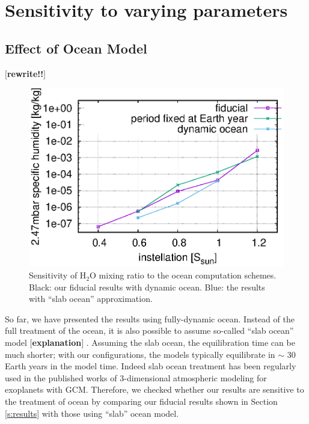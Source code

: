 \documentclass[11pt,numberedappendix,twocolappendix,]{emulateapj}
\def\water{H$_2$O }
\def\memo#1{\color{red}$[${\bf #1}$]$ \color{black}}
\begin{document}
\section{Sensitivity to varying parameters}
\label{s:sensitivity}

\subsection{Effect of Ocean Model}
\label{ss:sensitivity_ocean}

\memo{rewrite!!}

\begin{figure}[!h]
    \begin{center}
    \includegraphics[width=\hsize]{fig/AqOH0TLS_GJ876_q_sensitivity_changeS0X.eps}
    \end{center}
\caption{Sensitivity of \water mixing ratio to the ocean computation schemes. Black: our fiducial results with dynamic ocean. Blue: the results with ``slab ocean'' approximation. }
\label{fig:change_ocean}
\end{figure}

So far, we have presented the results using fully-dynamic ocean. 
Instead of the full treatment of the ocean, it is also possible to assume so-called ``slab ocean'' model \memo{explanation}. 
Assuming the slab ocean, the equilibration time can be much shorter; with our configurations, the models typically equilibrate in $\sim $ 30 Earth years in the model time. 
Indeed slab ocean treatment has been regularly used in the published works of 3-dimensional atmospheric modeling for exoplanets with GCM. 
Therefore, we checked whether our results are sensitive to the treatment of ocean by comparing our fiducial results shown in Section \ref{s:results} with those using ``slab'' ocean model. 
\end{document}
